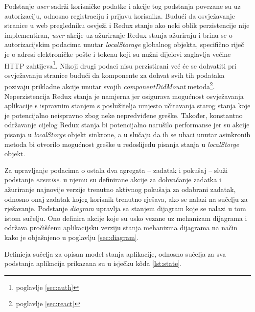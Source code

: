 \documentclass[times, utf8, diplomski, numeric]{fer}
\newcommand{\razmakp}{\vspace{18pt}}
\begin{document}
Podstanje \emph{user} sadrži korisničke podatke i akcije tog podstanja povezane su uz autorizaciju, odnosno registraciju i prijavu korisnika.
Budući da osvježavanje stranice u web pregledniku osvježi i Redux stanje ako neki oblik perzistencije nije implementiran, \emph{user} akcije uz ažuriranje Redux stanja ažuriraju i brinu se o autorizacijskim podacima unutar \emph{localStorage} globalnog objekta, specifično riječ je o adresi elektroničke pošte i tokenu koji su nužni dijelovi zaglavlja većine HTTP zahtijeva\footnote{poglavlje \ref{sec:auth}}.
Nikoji drugi podaci nisu perzistirani već će se dohvatiti pri osvježavanju stranice budući da komponente za dohvat svih tih podataka pozivaju prikladne akcije unutar svojih \emph{componentDidMount} metoda\footnote{poglavlje \ref{sec:react}}.
Neperzistencija Redux stanja je namjerna jer osigurava mogućnost osvježavanja aplikacije s ispravnim stanjem s poslužitelja umjesto učitavanja starog stanja koje je potencijalno neispravno zbog neke nepredviđene greške.
Također, konstantno održavanje cijelog Redux stanja bi potencijalno narušilo performanse jer su akcije pisanja u \emph{localStorge} objekt sinkrone, a u slučaju da ih se ubaci unutar asinkronih metoda bi otvorilo mogućnost greške u redoslijedu pisanja stanja u \emph{localStorge} objekt.

Za upravljanje podacima o ostala dva agregata -- zadatak i pokušaj -- služi podstanje \emph{exercise}.
u njemu su definirane akcije za dohvaćanje zadatka i ažuriranje najnovije verzije trenutno aktivnog pokušaja za odabrani zadatak, odnosno onaj zadatak kojeg korisnik trenutno rješava, ako se nalazi na sučelju za rješavanje.
Podstanje \emph{diagram} upravlja sa stanjem dijagram koje se nalazi u tom istom sučelju.
Ono definira akcije koje su usko vezane uz mehanizam dijagrama i održava pročišćenu aplikacijsku verziju stanja mehanizma dijagrama na način kako je objašnjeno u poglavlju \ref{sec:diagram}.

\razmakp

Definicja sučelja za opisan model stanja aplikacije, odnosno sučelja za sva podstanja aplikacija prikazana su u isječku kôda \ref{lst:state}.
\end{document}
